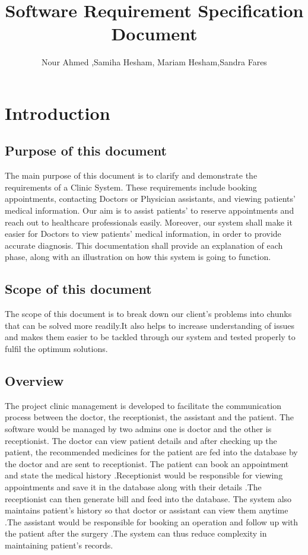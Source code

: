 \documentclass[]{article}
\title{Software Requirement Specification Document}
\author{Nour Ahmed ,Samiha Hesham, Mariam Hesham,Sandra Fares }
\begin{document}
\maketitle

\section{Introduction}

\subsection{Purpose of this document}
The main purpose of this document is to clarify and demonstrate the requirements of a Clinic System. These requirements include booking appointments, contacting Doctors or Physician assistants, and viewing patients' medical information. Our aim is to assist patients' to reserve appointments and reach out to healthcare professionals easily. Moreover, our system shall make it easier for Doctors to view patients' medical information, in order to provide accurate diagnosis. This documentation shall provide an explanation of each phase, along with an illustration on how this system is going to function. 

\subsection{ Scope of this document}
The scope of this document is to break down our client's problems into chunks that can be solved more readily.It also helps to increase understanding of issues and makes them easier to be tackled through our system and tested properly to fulfil the optimum solutions. 


\subsection{Overview}

The project clinic management is developed to facilitate the communication process between the doctor, the receptionist, the assistant and the patient. The software would be managed by two admins one is doctor and the other is receptionist. The doctor can view patient details and after checking up the patient, the recommended medicines for the patient are fed into the database by the doctor and are sent to receptionist. The patient can book an appointment and state the medical history .Receptionist would be responsible for viewing appointments and save it in the database along with their details .The receptionist can then generate bill and feed into the database. The system also maintains patient’s history so that doctor or assistant can view them anytime .The assistant would be responsible for booking an operation and follow up with the patient after the surgery .The system can thus reduce complexity in maintaining patient’s records.
\end{document}
